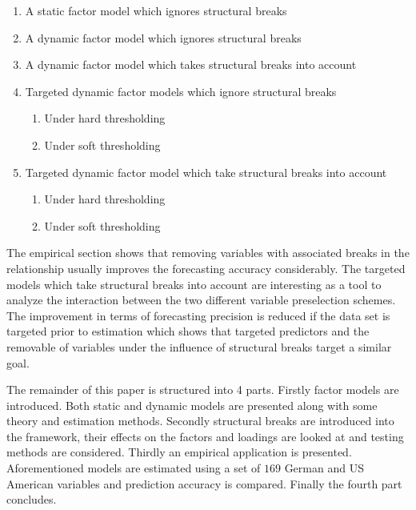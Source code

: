 \documentclass[12pt]{article}
\begin{document}
\begin{enumerate}
	\item A static factor model which ignores structural breaks
	\item A dynamic factor model which ignores structural breaks
	\item A dynamic factor model which takes structural breaks into account
	\item Targeted dynamic factor models which ignore structural breaks
		\begin{enumerate}
			\item Under hard thresholding
			\item Under soft thresholding
		\end{enumerate}
	\item Targeted dynamic factor model which take structural breaks into account
		\begin{enumerate}
			\item Under hard thresholding
			\item Under soft thresholding
		\end{enumerate}
\end{enumerate}

The empirical section shows that removing variables with associated breaks in the relationship usually improves the forecasting accuracy considerably. The targeted models which take structural breaks into account are interesting as a tool to analyze the interaction between the two different variable preselection schemes. The improvement in terms of forecasting precision is reduced if the data set is targeted prior to estimation which shows that targeted predictors and the removable of variables under the influence of structural breaks target a similar goal.

The remainder of this paper is structured into 4 parts. Firstly factor models are introduced. Both static and dynamic models are presented along with some theory and estimation methods. Secondly structural breaks are introduced into the framework, their effects on the factors and loadings are looked at and testing methods are considered. Thirdly an empirical application is presented. Aforementioned models are estimated using a set of $169$ German and US American variables and prediction accuracy is compared. Finally the fourth part concludes. \\
\end{document}
